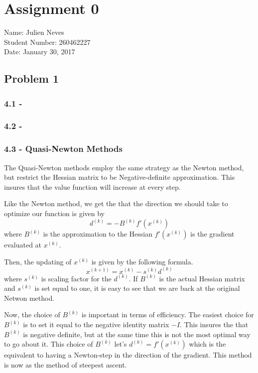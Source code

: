 \documentclass{article}
\begin{document}
\section*{Assignment 0}
Name: Julien Neves
\\Student Number: 260462227
\\Date: January 30, 2017

\subsection*{Problem 1}

\subsubsection*{4.1 - }
\subsubsection*{4.2 - }


\subsubsection*{4.3 - Quasi-Newton Methods}


The Quasi-Newton methods employ the same strategy as the Newton method, but restrict the Hessian matrix to be Negative-definite approximation. This insures that the value function will increase at every step.

Like the Newton method, we get the that the direction we should take to optimize our function is given by
$$
d^{(k)}= - B^{(k)}f'(x^{(k)})
$$
where $B^{(k)}$ is the approximation to the Hessian $f'(x^{(k)})$ is the gradient evaluated at $x^{(k)}$.

Then, the updating of $x^{(k)}$ is given by the following formula.
$$
x^{(k+1)}= x^{(k)}-s^{(k)}d^{(k)}
$$
where $s^{(k)}$ is scaling factor for the $d^{(k)}$. If $B^{(k)}$ is the actual Hessian matrix and $s^{(k)}$ is set equal to one, it is easy to see that we are back at the original Netwon method.

Now, the choice of $B^{(k)}$ is important in terms of efficiency. The easiest choice for $B^{(k)}$ is to set it equal to the negative identity matrix $-I$. This insures the that $B^{(k)}$ is negative definite, but at the same time this is not the most optimal way to go about it. This choice of $B^{(k)}$ let's $d^{(k)}= f'(x^{(k)})$ which is the equivalent to having a Newton-step in the direction of the gradient. This method is now as the method of steepest ascent. 
\end{document}
